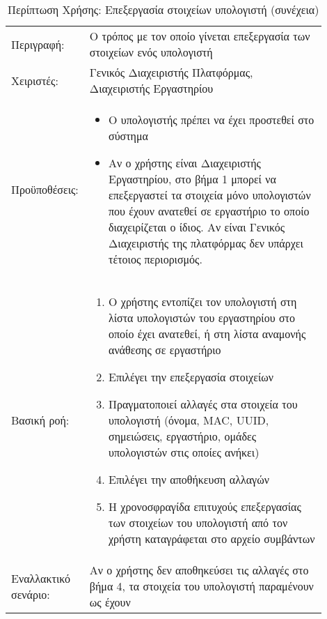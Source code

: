 %
%
\begin{longtable}{|p{0.14\linewidth}|p{0.76\linewidth}|}
	\caption{Περίπτωση Χρήσης: Επεξεργασία στοιχείων υπολογιστή} \label{tab:use-case-edit-computer} \\ \hline \endfirsthead
	\caption[{}]{Περίπτωση Χρήσης: Επεξεργασία στοιχείων υπολογιστή (συνέχεια)} \\ \endhead \endfoot
	Περιγραφή: & Ο τρόπος με τον οποίο γίνεται επεξεργασία των στοιχείων ενός υπολογιστή \\ \hline
	Χειριστές: & Γενικός Διαχειριστής Πλατφόρμας, Διαχειριστής Εργαστηρίου \\ \hline
	Προϋποθέσεις: &
	\begin{itemize}
		\vspace{-1cm}
		\addtolength{\itemindent}{-0.4cm}
		\item Ο υπολογιστής πρέπει να έχει προστεθεί στο σύστημα
		\item Αν ο χρήστης είναι Διαχειριστής Εργαστηρίου, στο βήμα 1 μπορεί να επεξεργαστεί τα στοιχεία μόνο υπολογιστών που έχουν ανατεθεί σε εργαστήριο το οποίο διαχειρίζεται ο ίδιος. Αν είναι Γενικός Διαχειριστής της πλατφόρμας δεν υπάρχει τέτοιος περιορισμός.
		\vspace{-0.7cm}
	\end{itemize} \\ \hline
	Βασική ροή: &
	\begin{enumerate}
		\vspace{-1cm}
		\addtolength{\itemindent}{-0.4cm}
		\item Ο χρήστης εντοπίζει τον υπολογιστή στη λίστα υπολογιστών του εργαστηρίου στο οποίο έχει ανατεθεί, ή στη λίστα αναμονής ανάθεσης σε εργαστήριο
		\item Επιλέγει την επεξεργασία στοιχείων
		\item Πραγματοποιεί αλλαγές στα στοιχεία του υπολογιστή (όνομα, MAC, UUID, σημειώσεις, εργαστήριο, ομάδες υπολογιστών στις οποίες ανήκει)
		\item Επιλέγει την αποθήκευση αλλαγών
		\item Η χρονοσφραγίδα επιτυχούς επεξεργασίας των στοιχείων του υπολογιστή από τον χρήστη καταγράφεται στο αρχείο συμβάντων
		\vspace{-0.7cm}
	\end{enumerate} \\ \hline
	Εναλλακτικό σενάριο: & Αν ο χρήστης δεν αποθηκεύσει τις αλλαγές στο βήμα 4, τα στοιχεία του υπολογιστή παραμένουν ως έχουν \\ \hline
\end{longtable}

